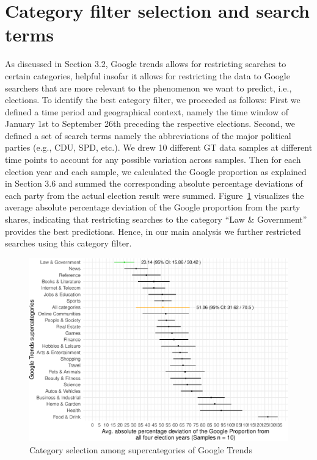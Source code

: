 \documentclass[
  letterpaper,
  DIV=11,
  numbers=noendperiod]{scrartcl}
\newcommand{\beginsupplement}{\setcounter{section}{0} \renewcommand{\thesection}{A\arabic{section}}  \setcounter{table}{0}  \renewcommand{\thetable}{A\arabic{table}} \setcounter{figure}{0} \renewcommand{\thefigure}{A\arabic{figure}}}
\begin{document}
\newpage

\textbf{}

\beginsupplement

\hypertarget{sec-categoryfilterselection}{%
\section{Category filter selection and search
terms}\label{sec-categoryfilterselection}}

As discussed in Section 3.2, Google trends allows for restricting
searches to certain categories, helpful insofar it allows for
restricting the data to Google searchers that are more relevant to the
phenomenon we want to predict, i.e., elections. To identify the best
category filter, we proceeded as follows: First we defined a time period
and geographical context, namely the time window of January 1st to
September 26th preceding the respective elections. Second, we defined a
set of search terms namely the abbreviations of the major political
parties (e.g., CDU, SPD, etc.). We drew 10 different GT data samples at
different time points to account for any possible variation across
samples. Then for each election year and each sample, we calculated the
Google proportion as explained in Section 3.6 and summed the
corresponding absolute percentage deviations of each party from the
actual election result were summed. Figure~\ref{fig-A1} visualizes the
average absolute percentage deviation of the Google proportion from the
party shares, indicating that restricting searches to the category ``Law
\& Government'' provides the best predictions. Hence, in our main
analysis we further restricted searches using this category filter.

\begin{figure}[H]

\caption{\label{fig-A1}Category selection among supercategories of
Google Trends}

{\centering \includegraphics{figures/fig-A1-1.pdf}

}

\end{figure}
\end{document}
